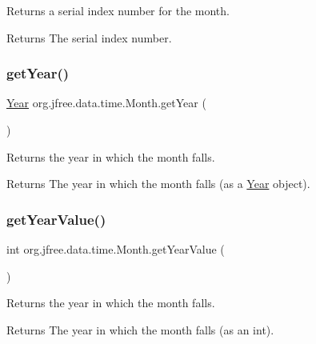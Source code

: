 Returns a serial index number for the month.

\begin{DoxyReturn}{Returns}
The serial index number. 
\end{DoxyReturn}
\mbox{\label{classorg_1_1jfree_1_1data_1_1time_1_1_month_a754f301f5b5cbf462655eddf616761f6}} 
\subsubsection{\texorpdfstring{get\+Year()}{getYear()}}
{\footnotesize\ttfamily \mbox{\hyperlink{classorg_1_1jfree_1_1data_1_1time_1_1_year}{Year}} org.\+jfree.\+data.\+time.\+Month.\+get\+Year (\begin{DoxyParamCaption}{ }\end{DoxyParamCaption})}

Returns the year in which the month falls.

\begin{DoxyReturn}{Returns}
The year in which the month falls (as a \mbox{\hyperlink{classorg_1_1jfree_1_1data_1_1time_1_1_year}{Year}} object). 
\end{DoxyReturn}
\mbox{\label{classorg_1_1jfree_1_1data_1_1time_1_1_month_a75ebe3893bbd8c5edbbf812fe21c4b75}} 
\subsubsection{\texorpdfstring{get\+Year\+Value()}{getYearValue()}}
{\footnotesize\ttfamily int org.\+jfree.\+data.\+time.\+Month.\+get\+Year\+Value (\begin{DoxyParamCaption}{ }\end{DoxyParamCaption})}

Returns the year in which the month falls.

\begin{DoxyReturn}{Returns}
The year in which the month falls (as an int). 
\end{DoxyReturn}
\mbox{\label{classorg_1_1jfree_1_1data_1_1time_1_1_month_ae95408b4de2c690ac58c09c9efe72b5b}} 
